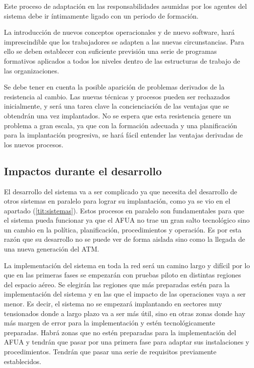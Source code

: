 Este proceso de adaptación en las responsabilidades asumidas por los agentes del sistema debe ir íntimamente ligado con un periodo de formación.

La introducción de nuevos conceptos operacionales y de nuevo software, hará imprescindible que los trabajadores se adapten a las nuevas circunstancias. Para ello se deben establecer con suficiente previsión una serie de programas formativos aplicados a todos los niveles dentro de las estructuras de trabajo de las organizaciones.

Se debe tener en cuenta la posible aparición de problemas derivados de la resistencia al cambio. Las nuevas técnicas y procesos pueden ser rechazados inicialmente, y será una tarea clave la concienciación de las ventajas que se obtendrán una vez implantados. No se espera que esta resistencia genere un problema a gran escala, ya que con la formación adecuada y una planificación para la implantación progresiva, se hará fácil entender las ventajas derivadas de los nuevos procesos.


\subsection{Impactos durante el desarrollo}

El desarrollo del sistema va a ser complicado ya que necesita del desarrollo de otros sistemas en paralelo para lograr su implantación, como ya se vio en el apartado (\ref{tit:sistemas}). Estos procesos en paralelo son fundamentales para que el sistema pueda funcionar ya que el AFUA no trae un gran salto tecnológico sino un cambio en la política, planificación, procedimientos y operación. Es por esta razón que su desarrollo no se puede ver de forma aislada sino como la llegada de una nueva generación del ATM.

La implementación del sistema en toda la red será un camino largo y difícil por lo que en las primeras fases se empezarán con pruebas piloto en distintas regiones del espacio aéreo. Se elegirán las regiones que más preparadas estén para la implementación del sistema y en las que el impacto de las operaciones vaya a ser menor. Es decir, el sistema no se empezará implantando en sectores muy tensionados donde a largo plazo va a ser más útil, sino en otras zonas donde hay más margen de error para la implementación y estén tecnológicamente preparadas. Habrá zonas que no estén preparadas para la implementación del AFUA y tendrán que pasar por una primera fase para adaptar sus instalaciones y procedimientos. Tendrán que pasar una serie de requisitos previamente establecidos.

